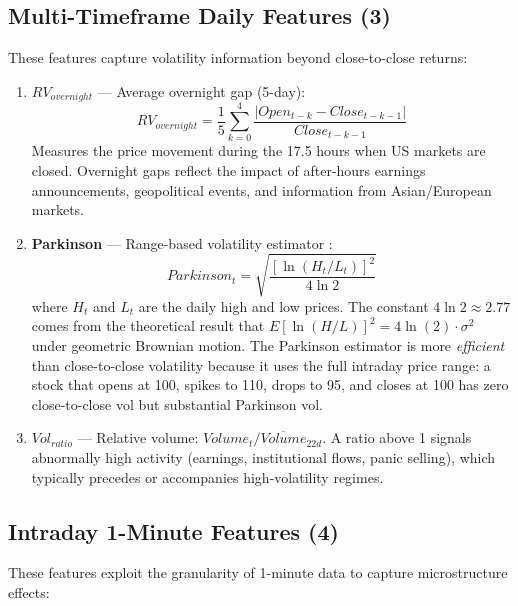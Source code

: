 \documentclass[11pt,a4paper]{article}
\begin{document}
\subsection{Multi-Timeframe Daily Features (3)}

These features capture volatility information beyond close-to-close returns:

\begin{enumerate}
    \item \textbf{$RV_{overnight}$} --- Average overnight gap (5-day):
    \begin{equation}
        RV_{overnight} = \frac{1}{5}\sum_{k=0}^{4} \frac{|Open_{t-k} - Close_{t-k-1}|}{Close_{t-k-1}}
    \end{equation}
    Measures the price movement during the 17.5 hours when US markets are closed. Overnight gaps reflect the impact of after-hours earnings announcements, geopolitical events, and information from Asian/European markets.

    \item \textbf{Parkinson} --- Range-based volatility estimator \citep{parkinson1980}:
    \begin{equation}
        Parkinson_t = \sqrt{\frac{[\ln(H_t/L_t)]^2}{4\ln 2}}
    \end{equation}
    where $H_t$ and $L_t$ are the daily high and low prices. The constant $4\ln 2 \approx 2.77$ comes from the theoretical result that $E[\ln(H/L)]^2 = 4\ln(2) \cdot \sigma^2$ under geometric Brownian motion. The Parkinson estimator is more \textit{efficient} than close-to-close volatility because it uses the full intraday price range: a stock that opens at 100, spikes to 110, drops to 95, and closes at 100 has zero close-to-close vol but substantial Parkinson vol.

    \item \textbf{$Vol_{ratio}$} --- Relative volume: $Volume_t / \overline{Volume}_{22d}$. A ratio above 1 signals abnormally high activity (earnings, institutional flows, panic selling), which typically precedes or accompanies high-volatility regimes.
\end{enumerate}

\subsection{Intraday 1-Minute Features (4)}

These features exploit the granularity of 1-minute data to capture microstructure effects:
\end{document}
